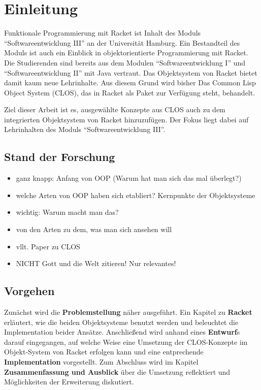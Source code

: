\chapter{Einleitung}
Funktionale Programmierung mit Racket ist Inhalt des Moduls ``Softwareentwicklung III'' an der Universität Hamburg. Ein Bestandteil des Moduls ist auch ein Einblick in objektorientierte Programmierung mit Racket. Die Studierenden sind bereits aus dem Modulen ``Softwareentwicklung I'' und ``Softwareentwicklung II'' mit Java vertraut. Das Objektsystem von Racket bietet damit kaum neue Lehrinhalte. Aus diesem Grund wird bisher Das Common Lisp Object System (CLOS), das in Racket als Paket zur Verfügung steht, behandelt. 

Ziel dieser Arbeit ist es, ausgewählte Konzepte aus CLOS auch zu dem integrierten Objektsystem von Racket hinzuzufügen. Der Fokus liegt dabei auf Lehrinhalten des Moduls ``Softwareentwicklung III''.

\section{Stand der Forschung} 
\begin{itemize}
 \item ganz knapp: Anfang von OOP (Warum hat man sich das mal überlegt?)
 \item welche Arten von OOP haben sich etabliert? Kernpunkte der Objektsysteme
 \item wichtig: Warum macht man das?
 \item von den Arten zu dem, was man sich ansehen will
 \item vllt. Paper zu CLOS
 \item NICHT Gott und die Welt zitieren! Nur relevantes!
\end{itemize}


\section{Vorgehen}
Zunächst wird die \textbf{Problemstellung} näher ausgeführt. Ein Kapitel zu \textbf{Racket} erläutert, wie die beiden Objektsysteme benutzt werden und beleuchtet die Implementation beider Ansätze. Anschließend wird anhand eines \textbf{Entwurf}s darauf eingegangen, auf welche Weise eine Umsetzung der CLOS-Konzepte im Objekt-System von Racket erfolgen kann und eine entprechende \textbf{Implementation} vorgestellt. Zum Abschluss wird im Kapitel \textbf{Zusammenfassung und Ausblick} über die Umsetzung reflektiert und Möglichkeiten der Erweiterung diskutiert.